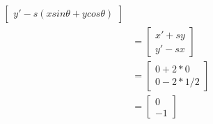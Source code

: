 \documentclass[letterpaper, 11pt]{article}
\begin{document}
\begin{align*}
\begin{bmatrix}
        y' - s(x sin\theta + y cos\theta)
    \end{bmatrix}                                                                        \\
                          & =
    \begin{bmatrix}
        x' + sy \\
        y' - sx
    \end{bmatrix}                                                                                           \\
                          & =
    \begin{bmatrix}
        0 + 2 * 0 \\
        0 - 2 * 1/2
    \end{bmatrix}                                                                                           \\
                          & =
    \begin{bmatrix}
        0 \\
        -1
    \end{bmatrix}
\end{align*}
\end{document}

